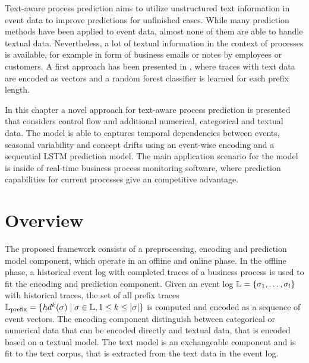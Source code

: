 Text-aware process prediction aims to utilize unstructured text information in event data to improve predictions for unfinished cases.
While many prediction methods have been applied to event data, almost none of them are able to handle textual data.
Nevertheless, a lot of textual information in the context of processes is available, for example in form of business emails or notes by employees or customers.
A first approach has been presented in \cite{DBLP:conf/bpm/TeinemaaDMF16}, where traces with text data are encoded as vectors and a random forest classifier is learned for each prefix length.

In this chapter a novel approach for text-aware process prediction is presented that considers control flow and additional numerical, categorical and textual data.
The model is able to captures temporal dependencies between events, seasonal variability and concept drifts using an event-wise encoding and a sequential LSTM prediction model.
The main application scenario for the model is inside of real-time business process monitoring software, where prediction capabilities for current processes give an competitive advantage.

\section{Overview}

The proposed framework consists of a preprocessing, encoding and prediction model component, which operate in an offline and online phase.
In the offline phase, a historical event log with completed traces of a business process is used to fit the encoding and prediction component.
Given an event log $\mathbb{L} = \{\sigma_1, \dots, \sigma_l\}$ with historical traces, the set of all prefix traces $\mathbb{L}_\mathrm{prefix} = \{ hd^k(\sigma) \mid  \sigma \in \mathbb{L}, 1 \leq k \leq |\sigma|\}$ is computed and encoded as a sequence of event vectors.
The encoding component distinguish between categorical or numerical data that can be encoded directly and textual data, that is encoded based on a textual model.
The text model is an exchangeable component and is fit to the text corpus, that is extracted from the text data in the event log.

